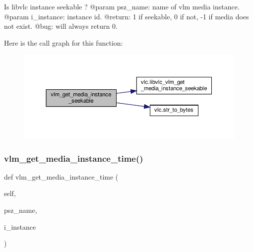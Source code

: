 \begin{DoxyVerb}Is libvlc instance seekable ?
@param psz_name: name of vlm media instance.
@param i_instance: instance id.
@return: 1 if seekable, 0 if not, -1 if media does not exist.
@bug: will always return 0.
\end{DoxyVerb}
 Here is the call graph for this function\+:
\nopagebreak
\begin{figure}[H]
\begin{center}
\leavevmode
\includegraphics[width=350pt]{classvlc_1_1_instance_a9163e1a129b34347564989ec3c860785_cgraph}
\end{center}
\end{figure}
\mbox{\label{classvlc_1_1_instance_ad91c405b7c321f63205ae6bd3d1a2591}} 
\subsubsection{\texorpdfstring{vlm\+\_\+get\+\_\+media\+\_\+instance\+\_\+time()}{vlm\_get\_media\_instance\_time()}}
{\footnotesize\ttfamily def vlm\+\_\+get\+\_\+media\+\_\+instance\+\_\+time (\begin{DoxyParamCaption}\item[{}]{self,  }\item[{}]{psz\+\_\+name,  }\item[{}]{i\+\_\+instance }\end{DoxyParamCaption})}

